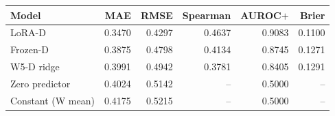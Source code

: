 
{\small\setlength{\tabcolsep}{4pt}
\begin{tabularx}{\textwidth}{Xrrrrr}
\toprule
Model & MAE & RMSE & Spearman & AUROC$+$ & Brier \\
\midrule
LoRA-D & 0.3470 & 0.4297 & 0.4637 & 0.9083 & 0.1100 \\
Frozen-D & 0.3875 & 0.4798 & 0.4134 & 0.8745 & 0.1271 \\
W5-D ridge & 0.3991 & 0.4942 & 0.3781 & 0.8405 & 0.1291 \\
Zero predictor & 0.4024 & 0.5142 & -- & 0.5000 & -- \\
Constant (W mean) & 0.4175 & 0.5215 & -- & 0.5000 & -- \\
\bottomrule
\end{tabularx}}
